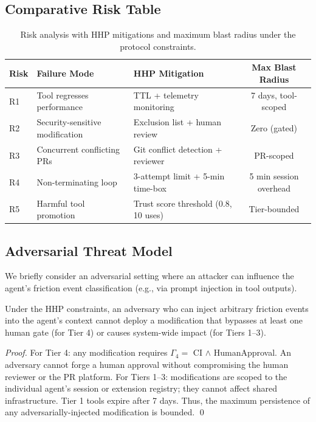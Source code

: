 \subsection{Comparative Risk Table}
\label{sec:risk-table}

\begin{table}[H]
\centering
\begin{tabularx}{\textwidth}{l X X c}
\toprule
Risk & Failure Mode & HHP Mitigation & Max Blast Radius \\
\midrule
R1 & Tool regresses performance & TTL + telemetry monitoring & 7 days, tool-scoped \\
R2 & Security-sensitive modification & Exclusion list + human review & Zero (gated) \\
R3 & Concurrent conflicting PRs & Git conflict detection + reviewer & PR-scoped \\
R4 & Non-terminating loop & 3-attempt limit + 5-min time-box & 5 min session overhead \\
R5 & Harmful tool promotion & Trust score threshold (0.8, 10 uses) & Tier-bounded \\
\bottomrule
\end{tabularx}
\caption{Risk analysis with HHP mitigations and maximum blast radius under
the protocol constraints.}
\label{tab:risks}
\end{table}

\subsection{Adversarial Threat Model}
\label{sec:adversarial}

We briefly consider an adversarial setting where an attacker can influence the
agent's friction event classification (e.g., via prompt injection in tool outputs).

\begin{proposition}
\label{prop:adversarial}
Under the HHP constraints, an adversary who can inject arbitrary friction events
into the agent's context cannot deploy a modification that bypasses at least
one human gate (for Tier 4) or causes system-wide impact (for Tiers 1--3).
\end{proposition}

\begin{proof}
For Tier 4: any modification requires $\Gamma_4 = $ CI $\wedge$ HumanApproval.
An adversary cannot forge a human approval without compromising the human
reviewer or the PR platform. For Tiers 1--3: modifications are scoped to the
individual agent's session or extension registry; they cannot affect shared
infrastructure. Tier 1 tools expire after 7 days. Thus, the maximum persistence
of any adversarially-injected modification is bounded. \qed
\end{proof}

